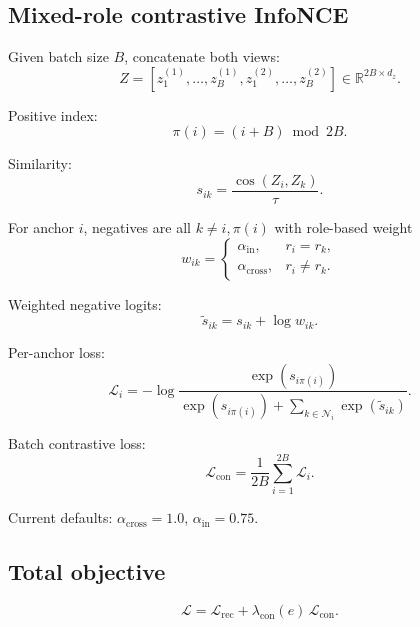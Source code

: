 \documentclass[11pt]{article}
\begin{document}
\subsection{Mixed-role contrastive InfoNCE}
Given batch size $B$, concatenate both views:
\begin{equation}
 Z=[z^{(1)}_1,\dots,z^{(1)}_B,z^{(2)}_1,\dots,z^{(2)}_B]\in\mathbb{R}^{2B\times d_z}.
\end{equation}

Positive index:
\begin{equation}
 \pi(i)=(i+B)\bmod 2B.
\end{equation}

Similarity:
\begin{equation}
 s_{ik}=\frac{\cos(Z_i,Z_k)}{\tau}.
\end{equation}

For anchor $i$, negatives are all $k\neq i,\pi(i)$ with role-based weight
\begin{equation}
w_{ik}=
\begin{cases}
\alpha_{\text{in}},&r_i=r_k,\\
\alpha_{\text{cross}},&r_i\neq r_k.
\end{cases}
\end{equation}

Weighted negative logits:
\begin{equation}
 \tilde s_{ik}=s_{ik}+\log w_{ik}.
\end{equation}

Per-anchor loss:
\begin{equation}
\mathcal{L}_i = -\log\frac{\exp(s_{i\pi(i)})}{\exp(s_{i\pi(i)}) + \sum_{k\in\mathcal{N}_i}\exp(\tilde s_{ik})}.
\end{equation}

Batch contrastive loss:
\begin{equation}
\mathcal{L}_{\text{con}} = \frac{1}{2B}\sum_{i=1}^{2B}\mathcal{L}_i.
\end{equation}

Current defaults: $\alpha_{\text{cross}}=1.0$, $\alpha_{\text{in}}=0.75$.

\subsection{Total objective}
\begin{equation}
 \mathcal{L}=\mathcal{L}_{\text{rec}} + \lambda_{\text{con}}(e)\,\mathcal{L}_{\text{con}}.
\end{equation}
\end{document}
